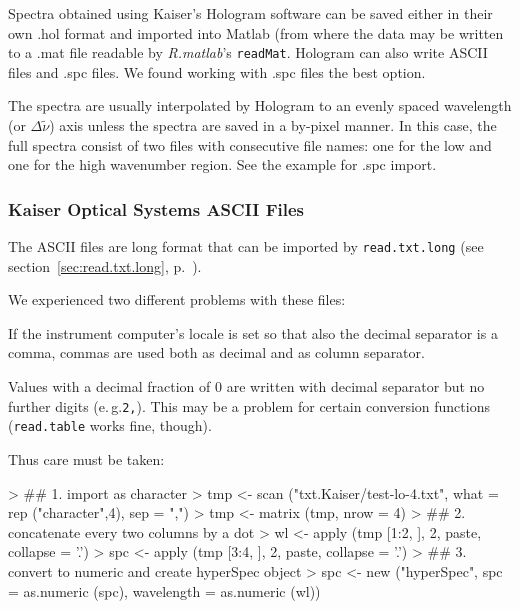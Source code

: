 \documentclass[english, a4paper, 10pt, headings=small, DIV11]{scrartcl}
\renewenvironment{Schunk}{\vspace{0pt}\begin{small}}{\end{small}\vspace{0pt}}
\newcommand{\Rfunction}[2][]{\texorpdfstring{\nohyphens{#1\texttt{#2}}}{#2}}
\newcommand{\Rpackage}[1]{\texorpdfstring{\nohyphens{\textit{#1}}}{#1}}
\newcommand{\eg}{e.\,g.\xspace}
\begin{document}
Spectra obtained using Kaiser's Hologram software can be saved either in their own .hol format and
imported into Matlab (from where the data may be written to a .mat file readable by
\Rpackage{R.matlab}'s \Rfunction{readMat}. Hologram can also write ASCII files and .spc files. We
found working with .spc files the best option.

The spectra are usually interpolated by Hologram to an evenly spaced wavelength (or
$\Delta\tilde\nu$) axis unless the spectra are saved in a by-pixel manner. In this case, the full
spectra consist of two files with consecutive file names: one for the low and one for the high
wavenumber region. See the example for .spc import.

\subsubsection{Kaiser Optical Systems ASCII Files}
\label{sec:KaiserASCII}

The ASCII files are long format that can be imported by \Rfunction{read.txt.long} (see
section~\ref{sec:read.txt.long}, p.~\pageref{sec:read.txt.long}).

We experienced two different problems with these files:
\begin{compactenum}
\item If the instrument computer's locale is set so that also the decimal separator is a comma,
  commas are used both as decimal and as column separator.
\item Values with a decimal fraction of $0$ are written with decimal separator but no further digits
  (\eg \texttt{2,}). This may be a problem for certain conversion functions (\Rfunction{read.table}
  works fine, though).
\end{compactenum}

Thus care must be taken:
\begin{Schunk}
\begin{Sinput}
> ## 1. import as character
> tmp <- scan ("txt.Kaiser/test-lo-4.txt", what = rep ("character",4), sep = ",")
> tmp <- matrix (tmp, nrow = 4)
> ## 2. concatenate every two columns by a dot
> wl <- apply (tmp [1:2, ], 2, paste, collapse = '.')
> spc <- apply (tmp [3:4, ], 2, paste, collapse = '.')
> ## 3. convert to numeric and create hyperSpec object
> spc <- new ("hyperSpec", spc = as.numeric (spc), wavelength = as.numeric (wl))
\end{Sinput}
\end{Schunk}
\end{document}
